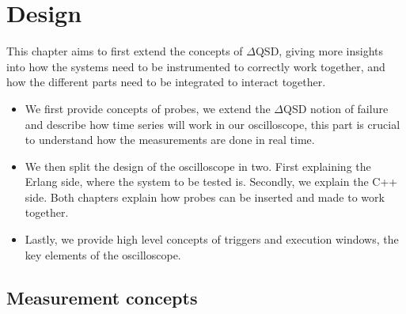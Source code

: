 \chapter{Design}
    This chapter aims to first extend the concepts of $\Delta$QSD, giving more insights into how the systems need to be instrumented to correctly work together, and how the different parts need to be integrated to interact together.
    \begin{itemize}
        \item We first provide concepts of probes, we extend the $\Delta$QSD notion of failure and describe how time series will work in our oscilloscope, this part is crucial to understand how the measurements are done in real time.
        \item We then split the design of the oscilloscope in two. First explaining the Erlang side, where the system to be tested is. Secondly, we explain the C++ side. Both chapters explain how probes can be inserted and made to work together.
        \item Lastly, we provide high level concepts of triggers and execution windows, the key elements of the oscilloscope. 
    \end{itemize}
    \section{Measurement concepts}
    
    
    
      
    
    
    
    
